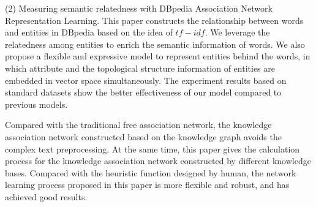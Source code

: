 \begin{englishabstract}
    (2) Measuring semantic relatedness with DBpedia Association Network Representation Learning. This paper constructs the relationship between words and entities in DBpedia based on the idea of $tf-idf$. We leverage the relatedness among entities to enrich the semantic information of words. We also propose a flexible and expressive model to represent entities behind the words, in which attribute and the topological structure information of entities are embedded in vector space simultaneously. The experiment results based on standard datasets show the better effectiveness of our model compared to previous models.

    Compared with the traditional free association network, the knowledge association network constructed based on the knowledge graph avoids the complex text preprocessing. At the same time, this paper gives the calculation process for the knowledge association network constructed by different knowledge bases. Compared with the heuristic function designed by human, the network learning process proposed in this paper is more flexible and robust, and has achieved good results.


\end{englishabstract}

%

\ensoochowauthor{~*~\quad }

\ensoochowtutor{*\quad}
